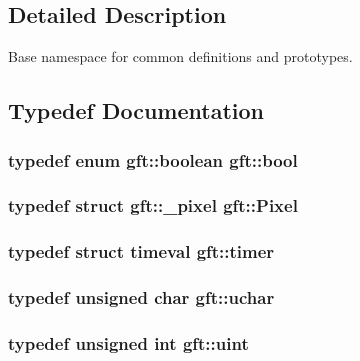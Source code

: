 \subsection{Detailed Description}
Base namespace for common definitions and prototypes. 

\subsection{Typedef Documentation}
\hypertarget{namespacegft_a033dba4822661600b08d2bbf16879252}{
\subsubsection[{bool}]{\setlength{\rightskip}{0pt plus 5cm}typedef enum {\bf gft\-::boolean}  {\bf gft\-::bool}}}\label{namespacegft_a033dba4822661600b08d2bbf16879252}
\hypertarget{namespacegft_a92574f04d80bffa13cacefde2f266c14}{
\subsubsection[{Pixel}]{\setlength{\rightskip}{0pt plus 5cm}typedef struct {\bf gft\-::\-\_\-pixel}  {\bf gft\-::\-Pixel}}}\label{namespacegft_a92574f04d80bffa13cacefde2f266c14}
\hypertarget{namespacegft_af9c336df27e94c088477837089de57cf}{
\subsubsection[{timer}]{\setlength{\rightskip}{0pt plus 5cm}typedef struct timeval {\bf gft\-::timer}}}\label{namespacegft_af9c336df27e94c088477837089de57cf}
\hypertarget{namespacegft_a6411e297d5ac5aa9b91a37da00952197}{
\subsubsection[{uchar}]{\setlength{\rightskip}{0pt plus 5cm}typedef unsigned char {\bf gft\-::uchar}}}\label{namespacegft_a6411e297d5ac5aa9b91a37da00952197}
\hypertarget{namespacegft_a4582b4dfe448021d46b76a75fb47799b}{
\subsubsection[{uint}]{\setlength{\rightskip}{0pt plus 5cm}typedef unsigned int {\bf gft\-::uint}}}\label{namespacegft_a4582b4dfe448021d46b76a75fb47799b}
